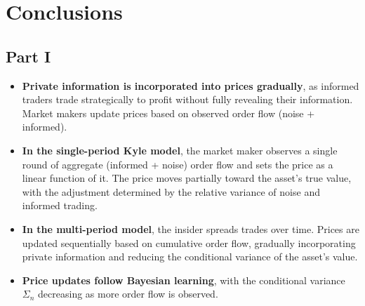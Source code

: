 \documentclass{beamer}
\begin{document}
\section{Conclusions}
\subsection{Part I}

\begin{frame}

\begin{itemize}\small
    \item \textbf{Private information is incorporated into prices gradually}, as informed traders trade strategically to profit without fully revealing their information. Market makers update prices based on observed order flow (noise + informed).

    \item \textbf{In the single-period Kyle model}, the market maker observes a single round of aggregate (informed + noise) order flow and sets the price as a linear function of it. The price moves partially toward the asset’s true value, with the adjustment determined by the relative variance of noise and informed trading.

    \item \textbf{In the multi-period model}, the insider spreads trades over time. Prices are updated sequentially based on cumulative order flow, gradually incorporating private information and reducing the conditional variance of the asset’s value.

    \item \textbf{Price updates follow Bayesian learning}, with the conditional variance \( \Sigma_n \) decreasing as more order flow is observed.

\end{itemize}
\end{frame}
\end{document}
